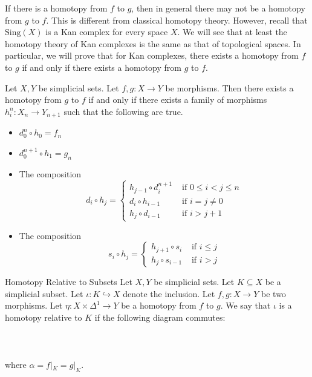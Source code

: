\documentclass[a4paper]{article}
\begin{document}
If there is a homotopy from $f$ to $g$, then in general there may not be a homotopy from $g$ to $f$. This is different from classical homotopy theory. However, recall that $\text{Sing}(X)$ is a Kan complex for every space $X$. We will see that at least the homotopy theory of Kan complexes is the same as that of topological spaces. In particular, we will prove that for Kan complexes, there exists a homotopy from $f$ to $g$ if and only if there exists a homotopy from $g$ to $f$. 

\begin{prp}{}{} Let $X,Y$ be simplicial sets. Let $f,g:X\to Y$ be morphisms. Then there exists a homotopy from $g$ to $f$ if and only if there exists a family of morphisms $h_i^n:X_n\to Y_{n+1}$ such that the following are true. 
\begin{itemize}
\item $d_0^n\circ h_0=f_n$
\item $d_0^{n+1}\circ h_1=g_n$
\item The composition $$d_i\circ h_j=\begin{cases}
h_{j-1}\circ d_i^{n+1} & \text{ if } 0\leq i<j\leq n\\
d_i\circ h_{i-1} & \text{ if } i=j\neq 0\\
h_j\circ d_{i-1}& \text{ if } i>j+1
\end{cases}$$
\item The composition $$s_i\circ h_j=\begin{cases}
h_{j+1}\circ s_i & \text{ if } i\leq j\\
h_j\circ s_{i-1} & \text{ if } i>j
\end{cases}$$
\end{itemize}
\end{prp}

\begin{defn}{Homotopy Relative to Subsets}{} Let $X,Y$ be simplicial sets. Let $K\subseteq X$ be a simplicial subset. Let $\iota:K\hookrightarrow X$ denote the inclusion. Let $f,g:X\to Y$ be two morphisms. Let $\eta:X\times\Delta^1\to Y$ be a homotopy from $f$ to $g$. We say that $\iota$ is a homotopy relative to $K$ if the following diagram commutes: \\~\\
\\~\\
where $\alpha=f|_K=g|_K$. 
\end{defn}
\end{document}
